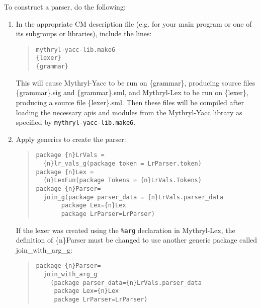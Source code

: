 To construct a parser, do the following:
\begin{enumerate}
\item In the appropriate CM description file (e.g. for your main
program or one of its subgroups or libraries), include the lines:
\begin{quote}
\begin{verbatim}
mythryl-yacc-lib.make6
{lexer}
{grammar}
\end{verbatim}  
\end{quote}
This will cause Mythryl-Yacc to be run on \{grammar\}, producing source files
\{grammar\}.sig and \{grammar\}.sml, and Mythryl-Lex to be run on
\{lexer\}, producing a source file \{lexer\}.sml.  Then these files
will be compiled after loading the necessary apis and modules
from the Mythryl-Yacc library as specified by {\tt mythryl-yacc-lib.make6}.
\item Apply generics to create the parser:
\begin{quote}
\begin{verbatim}
package {n}LrVals =
  {n}lr_vals_g(package token = LrParser.token)
package {n}Lex = 
  {n}LexFun(package Tokens = {n}LrVals.Tokens)
package {n}Parser=
  join_g(package parser_data = {n}LrVals.parser_data
       package Lex={n}Lex
       package LrParser=LrParser)
\end{verbatim}
\end{quote}
If the lexer was created using the {\tt \%arg} declaration in Mythryl-Lex,
the definition of \{n\}Parser must be changed to use another generic package
called join_with_arg_g:
\begin{quote}
\begin{verbatim}
package {n}Parser=
  join_with_arg_g
    (package parser_data={n}LrVals.parser_data
     package Lex={n}Lex
     package LrParser=LrParser)
\end{verbatim}
\end{quote}
\end{enumerate}

